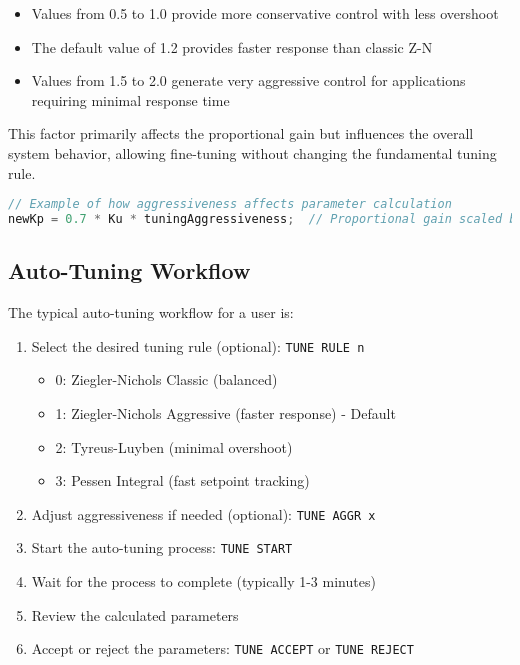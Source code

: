 \documentclass[a4paper,11pt]{article}
\begin{document}
\begin{itemize}
    \item Values from 0.5 to 1.0 provide more conservative control with less overshoot
    \item The default value of 1.2 provides faster response than classic Z-N
    \item Values from 1.5 to 2.0 generate very aggressive control for applications requiring minimal response time
\end{itemize}

This factor primarily affects the proportional gain but influences the overall system behavior, allowing fine-tuning without changing the fundamental tuning rule.

\begin{lstlisting}[language=C++, caption=Aggressiveness Implementation]
// Example of how aggressiveness affects parameter calculation
newKp = 0.7 * Ku * tuningAggressiveness;  // Proportional gain scaled by aggressiveness
\end{lstlisting}

\subsection{Auto-Tuning Workflow}

The typical auto-tuning workflow for a user is:

\begin{enumerate}
    \item Select the desired tuning rule (optional): \texttt{TUNE RULE n}
    \begin{itemize}
        \item 0: Ziegler-Nichols Classic (balanced)
        \item 1: Ziegler-Nichols Aggressive (faster response) - Default
        \item 2: Tyreus-Luyben (minimal overshoot)
        \item 3: Pessen Integral (fast setpoint tracking)
    \end{itemize}
    \item Adjust aggressiveness if needed (optional): \texttt{TUNE AGGR x}
    \item Start the auto-tuning process: \texttt{TUNE START}
    \item Wait for the process to complete (typically 1-3 minutes)
    \item Review the calculated parameters
    \item Accept or reject the parameters: \texttt{TUNE ACCEPT} or \texttt{TUNE REJECT}
\end{enumerate}
\end{document}
